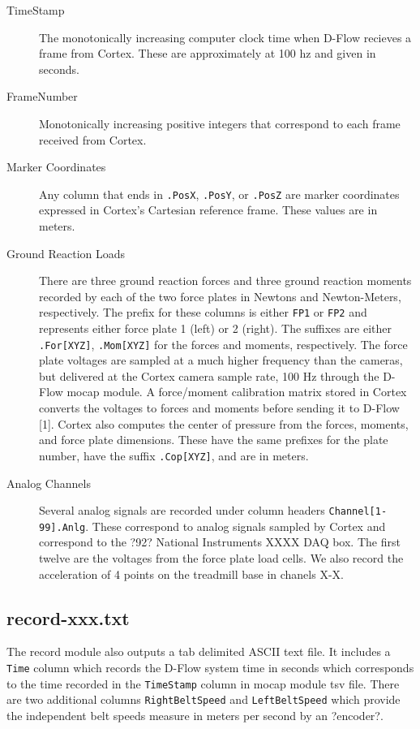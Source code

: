 \documentclass{article}
\begin{document}
\begin{description}
  \item[TimeStamp] The monotonically increasing computer clock time when D-Flow
    recieves a frame from Cortex. These are approximately at 100 hz and given
    in seconds.
  \item[FrameNumber] Monotonically increasing positive integers that correspond
    to each frame received from Cortex.
  \item[Marker Coordinates] Any column that ends in \verb+.PosX+, \verb+.PosY+,
    or \verb+.PosZ+ are marker coordinates expressed in Cortex's Cartesian
    reference frame. These values are in meters.
  \item[Ground Reaction Loads] There are three ground reaction forces and three
    ground reaction moments recorded by each of the two force plates in Newtons
    and Newton-Meters, respectively. The prefix for these columns is either
    \verb+FP1+ or \verb+FP2+ and represents either force plate 1 (left) or 2
    (right). The suffixes are either \verb+.For[XYZ]+, \verb+.Mom[XYZ]+ for the
    forces and moments, respectively. The force plate voltages are sampled at a
    much higher frequency than the cameras, but delivered at the Cortex camera
    sample rate, 100 Hz through the D-Flow mocap module. A force/moment
    calibration matrix stored in Cortex converts the voltages to forces and
    moments before sending it to D-Flow [1]. Cortex also computes the center of
    pressure from the forces, moments, and force plate dimensions. These have
    the same prefixes for the plate number, have the suffix \verb+.Cop[XYZ]+,
    and are in meters.
  \item[Analog Channels] Several analog signals are recorded under column
    headers \verb+Channel[1-99].Anlg+. These correspond to analog signals
    sampled by Cortex and correspond to the ?92? National Instruments XXXX DAQ
    box. The first twelve are the voltages from the force plate load cells. We
    also record the acceleration of 4 points on the treadmill base in chanels
    X-X.
\end{description}

\subsection{record-xxx.txt}
%
The record module also outputs a tab delimited ASCII text file. It includes a
\verb+Time+ column which records the D-Flow system time in seconds which
corresponds to the time recorded in the \verb+TimeStamp+ column in mocap module
tsv file. There are two additional columns \verb+RightBeltSpeed+ and
\verb+LeftBeltSpeed+ which provide the independent belt speeds measure in
meters per second by an ?encoder?.
\end{document}
